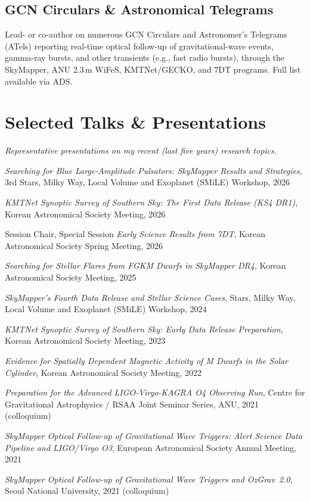 \documentclass[letterpaper,11pt]{article}
\begin{document}
\subsection*{GCN Circulars \& Astronomical Telegrams}
Lead- or co-author on numerous GCN Circulars and Astronomer's Telegrams (ATels) reporting
real-time optical follow-up of gravitational-wave events, gamma-ray bursts, and other
transients (e.g., fast radio bursts), through the SkyMapper, ANU 2.3\,m
WiFeS, KMTNet/GECKO, and 7DT programs. Full list available via ADS.

\section*{Selected Talks \& Presentations}
\emph{Representative presentations on my recent (last five years) research topics.}
\begin{etaremune}
\item \emph{Searching for Blue Large-Amplitude Pulsators: SkyMapper Results and
Strategies}, 3rd Stars, Milky Way, Local Volume and Exoplanet (SMiLE) Workshop, 2026
\item \emph{KMTNet Synoptic Survey of Southern Sky: The First Data Release (KS4 DR1)},
Korean Astronomical Society Meeting, 2026
\item Session Chair, Special Session \emph{Early Science Results from 7DT}, Korean
Astronomical Society Spring Meeting, 2026
\item \emph{Searching for Stellar Flares from FGKM Dwarfs in SkyMapper DR4}, Korean
Astronomical Society Meeting, 2025
\item \emph{SkyMapper's Fourth Data Release and Stellar Science Cases}, Stars, Milky Way,
Local Volume and Exoplanet (SMiLE) Workshop, 2024
\item \emph{KMTNet Synoptic Survey of Southern Sky: Early Data Release Preparation},
Korean Astronomical Society Meeting, 2023
\item \emph{Evidence for Spatially Dependent Magnetic Activity of M Dwarfs in the Solar
Cylinder}, Korean Astronomical Society Meeting, 2022
\item \emph{Preparation for the Advanced LIGO-Virgo-KAGRA O4 Observing Run}, Centre for
Gravitational Astrophysics / RSAA Joint Seminar Series, ANU, 2021 (colloquium)
\item \emph{SkyMapper Optical Follow-up of Gravitational Wave Triggers: Alert Science
Data Pipeline and LIGO/Virgo O3}, European Astronomical Society Annual Meeting, 2021
\item \emph{SkyMapper Optical Follow-up of Gravitational Wave Triggers and OzGrav~2.0},
Seoul National University, 2021 (colloquium)

\end{etaremune}
\end{document}
